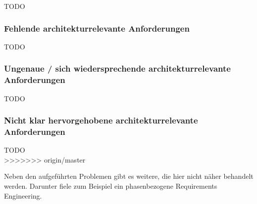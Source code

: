 TODO \\

\subsubsection{Fehlende architekturrelevante Anforderungen}

TODO \\

\subsubsection{Ungenaue / sich wiedersprechende architekturrelevante Anforderungen}

TODO \\

\subsubsection{Nicht klar hervorgehobene architekturrelevante Anforderungen}

TODO \\
>>>>>>> origin/master

Neben den aufgeführten Problemen gibt es weitere, die hier nicht näher behandelt werden. Darunter fiele zum Beispiel ein phasenbezogene Requirements Engineering.
